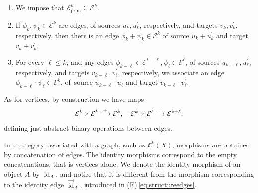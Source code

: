 \documentclass[11pt]{article}
\newcommand\To[1]{\mathchoice{\xrightarrow{\kern1pt#1\kern1pt}}{\stackrel{#1}{\longrightarrow}}{}{}}
\theoremstyle{plain}
\theoremstyle{definition}
\newcommand{\Ecal}{\mathcal E}
\newcommand{\Cfrak}{\mathfrak C}
\newcommand{\cfrak}{\mathfrak c}
\newcommand{\bis}{\prime\prime}
\newcommand{\prim}{\mathrm{prim}}
\DeclareMathOperator{\id}{id}
\begin{document}
\begin{enumerate}
\begin{enumerate}
\begin{enumerate}
\item\label{item:formal-iso-5} \emph{Whitney formula}. For every exact sequence of vector bundles $0\to E^{\prime}\to E\to E^{\bis}\to 0$ and every integer $k \geq 0$, two edges in $\Ecal^k_{\prim}$:
\begin{displaymath}
\xymatrix@C=1.2cm{
\cfrak_{k}(E) \ar@<.8ex>[r] &\ar@<.8ex>[l]\sum_{i=0}^{k} \cfrak_{i}(E^{\prime}) \cdot \cfrak_{k-i}(E^{\bis}).
}
\end{displaymath}
Here, we follow the convention \eqref{eq:convention-sum} for the reiterated addition.
\item \emph{Isomorphisms of vector bundles}. For every isomorphism of vector bundles $\varphi\colon E\!\to\! F$ and every integer $k \!\geq\! 0$, two edges in~$\Ecal^k_{\prim}$:
\begin{displaymath}
\xymatrix@C=1.2cm{
\cfrak_{k}(E) \ar@<.8ex>[r]^-{[\varphi]_k} & \ar@<.8ex>[l]^-{[\varphi]^{-1}_k} \cfrak_{k}(F).
}
\end{displaymath}
\end{enumerate}
\end{enumerate}
\item We impose that $\Ecal^k_{\prim} \subseteq \Ecal^k$.

\item If $\phi_k, \psi_k \in \Ecal^k$ are edges, of sources $u_{k}, u_{k}^{\prime}$, respectively, and targets $v_{k},v_{k}^{\prime}$, respectively, then there is an edge $\phi_k + \psi_k \in \Ecal^k$ of source $u_{k}+u_{k}^{\prime}$ and target $v_{k}+v_{k}^{\prime}$.

\item For every $\ell\leq k$, and any edges $\phi_{k-\ell} \in \Ecal^{k-\ell}, \psi_\ell \in \Ecal^{\ell}$, of sources $u_{k-\ell}, u_{\ell}^{\prime}$, respectively, and targets $v_{k-\ell},v_{\ell}^{\prime}$, respectively, we associate an edge $\phi_{k-\ell} \cdot \psi_\ell \in \Ecal^{k}$, of~source $u_{k-\ell}\cdot u_{\ell}^{\prime}$ and target $v_{k-\ell}\cdot v_{\ell}^{\prime}$.
\end{enumerate}

As for vertices, by construction we have maps
\begin{equation}\label{eq:operations-edges}
\Ecal^{k}\times\Ecal^{k}\To{+}\Ecal^{k},\quad \Ecal^{k}\times\Ecal^{\ell}\To{\,\cdot\,}\Ecal^{k+\ell},
\end{equation}
defining just abstract binary operations between edges.

In a category associated with a graph, such as $\Cfrak^{k}(X)$, morphisms are obtained by concatenation of edges. The identity morphisms correspond to the empty concatenations, that is vertices alone. We denote the identity morphism of an object $A$ by $\id_A$, and notice that it is different from the morphism corresponding to the identity edge $\overset{\to}{\id}_A$, introduced in (E)\,\eqref{eq:structureedges}.
\end{document}
